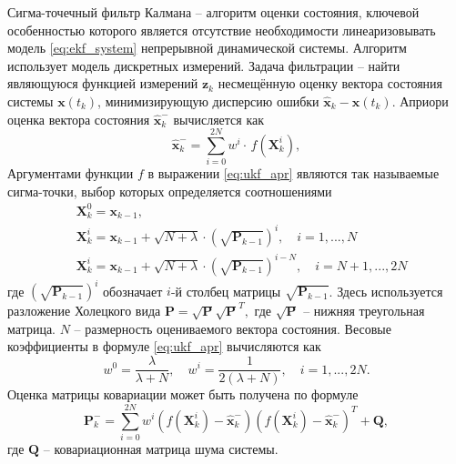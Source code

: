 Сигма-точечный фильтр Калмана -- алгоритм оценки состояния, ключевой особенностью которого является отсутствие необходимости линеаризовывать модель \eqref{eq:ekf_system} непрерывной динамической системы. Алгоритм использует модель дискретных измерений.
Задача фильтрации -- найти являющуюся функцией измерений $\bm z_k$ несмещённую оценку вектора состояния системы  $\bm x(t_k)$, минимизирующую дисперсию ошибки  ${\hat{\bm{x}}_k} - \bm x({t_k})$.
Априори оценка вектора состояния $\bm{\hat x}_k^-$ вычисляется как
\begin{equation} \label{eq:ukf_apr}
{\bm{\hat x}}_k^-  = \sum\limits_{i = 0}^{2N} {{w^i} \cdot } \,f\left( {{\bm{X}}_k^i} \right),
\end{equation}
Аргументами функции $f$ в выражении \eqref{eq:ukf_apr} являются так называемые сигма-точки, выбор которых определяется соотношениями
\begin{equation} \label{eq:ukf_points}
\begin{aligned}
&{{\bm{X}}_k^0 = {{\bm{x}}_{k - 1}}},
\\
&{{\bm{X}}_k^i = {{\bm{x}}_{k - 1}} + \sqrt {N + {{\lambda }}}  \cdot {{\left( {\sqrt {{{\bm{P}}_{k - 1}}} } \right)}^i}}, \quad {i = 1,...,N}
\\
&{{\bm{X}}_k^i = {{\bm{x}}_{k - 1}} + \sqrt {N + {{\lambda }}}  \cdot {{\left( {\sqrt {{{\bm{P}}_{k - 1}}} } \right)}^{i - N}}}, \quad {i = N + 1,...,2N}
\end{aligned}
\end{equation}
где
${{{\left( {\sqrt {{{\bm{P}}_{k - 1}}} } \right)}^i}}$
обозначает  $i$-й столбец матрицы ${\sqrt {{{\bm{P}}_{k - 1}}} }$.  Здесь используется разложение Холецкого \cite{Verbjitsky01} вида
${\bm{P}} = \sqrt {\bm{P}} {\sqrt {\bm{P}} ^T},$
где $\sqrt {\bm{P}}$ -- нижняя треугольная матрица. $N$ -- размерность оцениваемого вектора состояния. Весовые коэффициенты в формуле \eqref{eq:ukf_apr} вычисляются как
\begin{equation}
{w^0} = \frac{{{\lambda }}}{{{{\lambda }} + N}},
\quad
{w^i} = \frac{1}{{2\left( {{{\lambda }} + N} \right)}},
\quad
i = 1,...,2N.
\end{equation}
Оценка матрицы ковариации может быть получена по формуле
\begin{equation} \label{eq:ukf_p_apr}
{\bm{P}}_k^ -  = \sum\limits_{i = 0}^{2N} {{w^i}\left( {f\left( {{\bm{X}}_k^i} \right) - {\bm{\hat x}}_k^ - } \right)} {\left( {f\left( {{\bm{X}}_k^i} \right) - {\bm{\hat x}}_k^ - } \right)^{{T}}} + {\bm{Q}},
\end{equation}
где $\bm{Q}$ -- ковариационная матрица шума системы.
